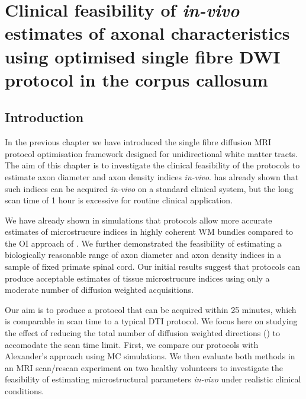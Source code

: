 \chapter{Clinical feasibility of \textit{in-vivo} estimates of axonal characteristics using optimised single fibre DWI protocol in the corpus callosum}
\label{chapter8}
\section{Introduction}
In the previous chapter we have introduced the single fibre \SF{} diffusion MRI protocol optimisation framework designed for unidirectional white matter tracts. The aim of this chapter is to investigate the clinical feasibility of the \SF{} protocols to estimate axon diameter and axon density indices \emph{in-vivo}.  has already shown that such indices can be acquired \emph{in-vivo} on a standard clinical system, but the long scan time of 1 hour is excessive for routine clinical application.  


We have already shown in simulations that \SF{} protocols allow more accurate estimates of microstrucure indices in highly coherent WM bundles compared to the \gls{OI} approach of \citet{Alexander:2008}. We further demonstrated the feasibility of estimating a biologically reasonable range of axon diameter and axon density indices in a sample of fixed primate spinal cord. Our initial results suggest that \SF{} protocols can produce acceptable estimates of tissue microstrucure indices using only a moderate number of diffusion weighted acquisitions. 

Our aim is to produce a \SF{} protocol that can be acquired within 25 minutes, which is comparable in scan time to a typical DTI protocol. We focus here on studying the effect of reducing the total number of diffusion weighted directions (\SF{}) to accomodate the scan time limit. First, we compare our \SF{} protocols with Alexander's \OI{} approach using \gls{MC} simulations. We then evaluate both methods in an MRI scan/rescan experiment on two healthy volunteers to investigate the feasibility of estimating microstructural parameters \emph{in-vivo} under realistic clinical conditions.

